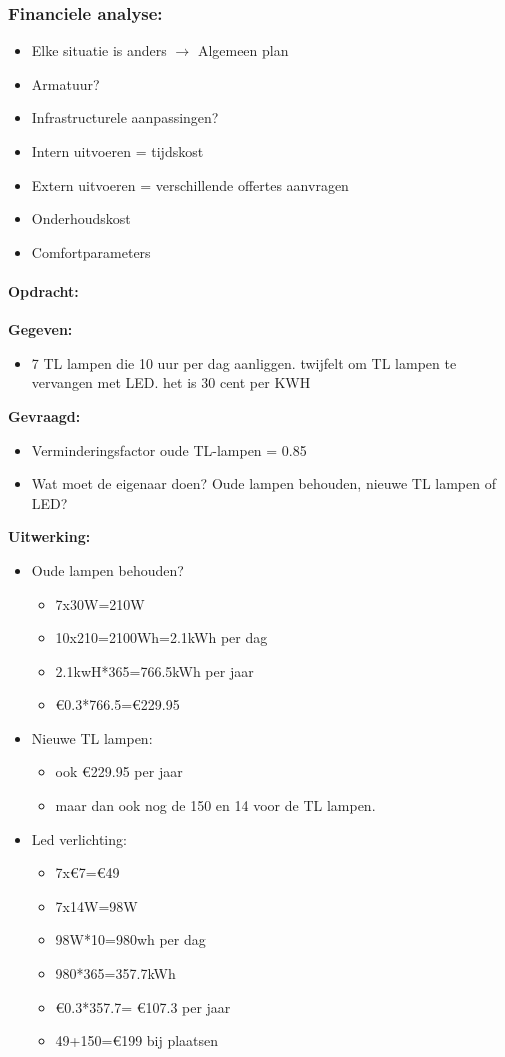 \documentclass[12pt]{article}
\begin{document}
\subsubsection{Financiele analyse:}\begin{itemize}
    \item Elke situatie is anders $\rightarrow$ Algemeen plan 
    \item Armatuur?
    \item Infrastructurele aanpassingen?
    \item Intern uitvoeren = tijdskost
    \item Extern uitvoeren = verschillende offertes aanvragen
    \item Onderhoudskost
    \item Comfortparameters
\end{itemize}
\paragraph{Opdracht:}
\textbf{Gegeven:}\begin{itemize}
    \item 7 TL lampen die 10 uur per dag aanliggen. twijfelt om TL lampen te vervangen met LED. het is 30 cent per KWH
\end{itemize}
\textbf{Gevraagd:}\begin{itemize}
    \item Verminderingsfactor oude TL-lampen = 0.85
    \item Wat moet de eigenaar doen? Oude lampen behouden, nieuwe TL lampen of LED?
\end{itemize}
\textbf{Uitwerking:}\begin{itemize}
    \item Oude lampen behouden?\begin{itemize}
        \item 7x30W=210W
        \item 10x210=2100Wh=2.1kWh per dag 
        \item 2.1kwH*365=766.5kWh per jaar 
        \item €0.3*766.5=€229.95
    \end{itemize}
    \item Nieuwe TL lampen:\begin{itemize}
        \item ook €229.95 per jaar
        \item maar dan ook nog de 150 en 14 voor de TL lampen.
    \end{itemize}
    \item Led verlichting:\begin{itemize}
        \item 7x€7=€49
        \item 7x14W=98W
        \item 98W*10=980wh per dag
        \item 980*365=357.7kWh 
        \item €0.3*357.7= €107.3 per jaar
        \item 49+150=€199 bij plaatsen
    \end{itemize}
\end{itemize}
\end{document}
